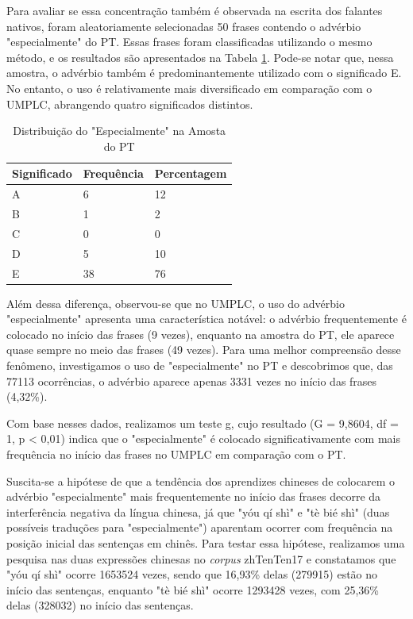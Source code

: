 \documentclass[portuguese]{textolivre}
\begin{document}
Para avaliar se essa concentração também é observada na escrita dos falantes nativos, foram aleatoriamente selecionadas 50 frases contendo o advérbio "especialmente" do PT. Essas frases foram classificadas utilizando o mesmo método, e os resultados são apresentados na Tabela \ref{tab11}. Pode-se notar que, nessa amostra, o advérbio também é predominantemente utilizado com o significado E. No entanto, o uso é relativamente mais diversificado em comparação com o UMPLC, abrangendo quatro significados distintos.

\begin{table}[h]
\centering
\begin{threeparttable}
\caption{Distribuição do "Especialmente" na Amosta do PT}
\label{tab11}
\begin{tabular}{lll}
\toprule
Significado & Frequência & Percentagem \\ 
\midrule
A           & 6          & 12          \\ 
B           & 1          & 2           \\ 
C           & 0          & 0           \\ 
D           & 5          & 10          \\ 
E           & 38         & 76          \\ 
\bottomrule
\end{tabular}
\end{threeparttable}
\end{table}

Além dessa diferença, observou-se que no UMPLC, o uso do advérbio "especialmente" apresenta uma característica notável: o advérbio frequentemente é colocado no início das frases (9 vezes), enquanto na amostra do PT, ele aparece quase sempre no meio das frases (49 vezes). Para uma melhor compreensão desse fenômeno, investigamos o uso de "especialmente" no PT e descobrimos que, das 77113 ocorrências, o advérbio aparece apenas 3331 vezes no início das frases (4,32\%).

Com base nesses dados, realizamos um teste g, cujo resultado (G = 9,8604, df = 1, p < 0,01) indica que o "especialmente" é colocado significativamente com mais frequência no início das frases no UMPLC em comparação com o PT.

Suscita-se a hipótese de que a tendência dos aprendizes chineses de colocarem o advérbio "especialmente" mais frequentemente no início das frases decorre da interferência negativa da língua chinesa, já que "yóu qí shì" e "tè bié shì" (duas possíveis traduções para "especialmente") aparentam ocorrer com frequência na posição inicial das sentenças em chinês. Para testar essa hipótese, realizamos uma pesquisa nas duas expressões chinesas no \textit{corpus} zhTenTen17 e constatamos que "yóu qí shì" ocorre 1653524 vezes, sendo que 16,93\% delas (279915) estão no início das sentenças, enquanto "tè bié shì" ocorre 1293428 vezes, com 25,36\% delas (328032) no início das sentenças.
\end{document}
